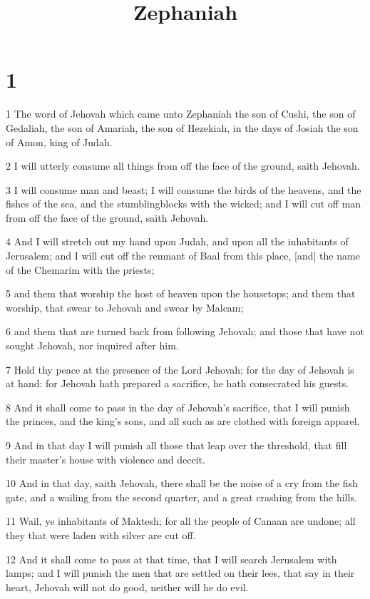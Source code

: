 

\title{Zephaniah}

\chapter{1}

\par 1 The word of Jehovah which came unto Zephaniah the son of Cushi, the son of Gedaliah, the son of Amariah, the son of Hezekiah, in the days of Josiah the son of Amon, king of Judah.
\par 2 I will utterly consume all things from off the face of the ground, saith Jehovah.
\par 3 I will consume man and beast; I will consume the birds of the heavens, and the fishes of the sea, and the stumblingblocks with the wicked; and I will cut off man from off the face of the ground, saith Jehovah.
\par 4 And I will stretch out my hand upon Judah, and upon all the inhabitants of Jerusalem; and I will cut off the remnant of Baal from this place, [and] the name of the Chemarim with the priests;
\par 5 and them that worship the host of heaven upon the housetops; and them that worship, that swear to Jehovah and swear by Malcam;
\par 6 and them that are turned back from following Jehovah; and those that have not sought Jehovah, nor inquired after him.
\par 7 Hold thy peace at the presence of the Lord Jehovah; for the day of Jehovah is at hand: for Jehovah hath prepared a sacrifice, he hath consecrated his guests.
\par 8 And it shall come to pass in the day of Jehovah's sacrifice, that I will punish the princes, and the king's sons, and all such as are clothed with foreign apparel.
\par 9 And in that day I will punish all those that leap over the threshold, that fill their master's house with violence and deceit.
\par 10 And in that day, saith Jehovah, there shall be the noise of a cry from the fish gate, and a wailing from the second quarter, and a great crashing from the hills.
\par 11 Wail, ye inhabitants of Maktesh; for all the people of Canaan are undone; all they that were laden with silver are cut off.
\par 12 And it shall come to pass at that time, that I will search Jerusalem with lamps; and I will punish the men that are settled on their lees, that say in their heart, Jehovah will not do good, neither will he do evil.
